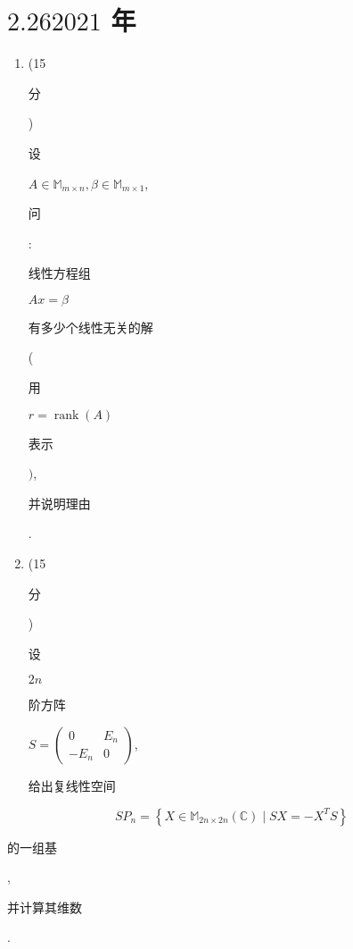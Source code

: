 \documentclass[10pt]{article}
\begin{document}
\section{$2.262021$ 年}
\begin{enumerate}
  \item (15 \begin{CJK}{UTF8}{mj}分\end{CJK}) \begin{CJK}{UTF8}{mj}设\end{CJK} $A \in \mathbb{M}_{m \times n}, \beta \in \mathbb{M}_{m \times 1}$, \begin{CJK}{UTF8}{mj}问\end{CJK}: \begin{CJK}{UTF8}{mj}线性方程组\end{CJK} $A x=\beta$ \begin{CJK}{UTF8}{mj}有多少个线性无关的解\end{CJK} (\begin{CJK}{UTF8}{mj}用\end{CJK} $r=\operatorname{rank}(A)$ \begin{CJK}{UTF8}{mj}表示\end{CJK} $)$,\begin{CJK}{UTF8}{mj}并说明理由\end{CJK}.

  \item (15 \begin{CJK}{UTF8}{mj}分\end{CJK}) \begin{CJK}{UTF8}{mj}设\end{CJK} $2 n$ \begin{CJK}{UTF8}{mj}阶方阵\end{CJK} $S=\left(\begin{array}{cc}0 & E_{n} \\ -E_{n} & 0\end{array}\right)$, \begin{CJK}{UTF8}{mj}给出复线性空间\end{CJK}

\end{enumerate}
$$
S P_{n}=\left\{X \in \mathbb{M}_{2 n \times 2 n}(\mathbb{C}) \mid S X=-X^{T} S\right\}
$$
\begin{CJK}{UTF8}{mj}的一组基\end{CJK}, \begin{CJK}{UTF8}{mj}并计算其维数\end{CJK}.
\end{document}
